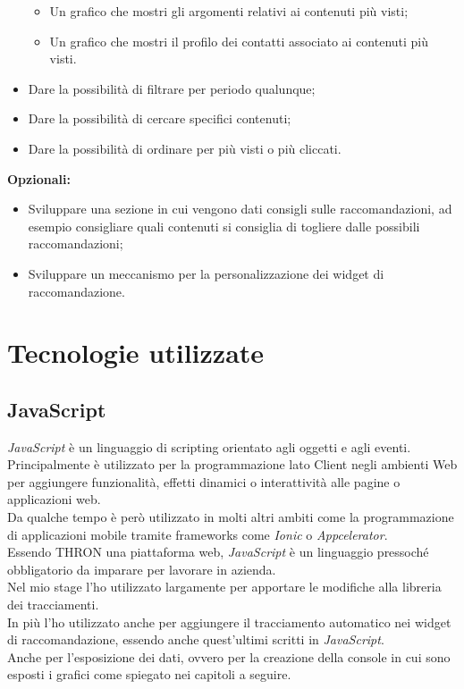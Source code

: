 \documentclass[a4paper, 12pt, twoside, openright]{book}
\begin{document}
\begin{itemize}
\begin{itemize}
		\item Un grafico che mostri gli argomenti relativi ai contenuti più visti;
		\item Un grafico che mostri il profilo dei contatti associato ai contenuti più visti.
		
	\end{itemize}

	\item Dare la possibilità di filtrare per periodo qualunque;
	\item Dare la possibilità di cercare specifici contenuti;
	\item Dare la possibilità di ordinare per più visti o più cliccati.
\end{itemize}
\textbf{Opzionali:}
\begin{itemize}
	\item Sviluppare una sezione in cui vengono dati consigli sulle raccomandazioni, ad esempio consigliare quali contenuti si consiglia di togliere dalle possibili raccomandazioni;
	\item Sviluppare un meccanismo per la personalizzazione dei widget di raccomandazione.
\end{itemize}

\newpage{}
\section{Tecnologie utilizzate}

\subsection{JavaScript}
\textit{JavaScript} è un linguaggio di scripting orientato agli oggetti e agli eventi. Principalmente è utilizzato per la programmazione lato Client negli ambienti Web per aggiungere funzionalità, effetti dinamici o interattività alle pagine o applicazioni web.\\
Da qualche tempo è però utilizzato in molti altri ambiti come la programmazione di applicazioni mobile tramite frameworks come \textit{Ionic} o \textit{Appcelerator}.\\

Essendo THRON una piattaforma web, \textit{JavaScript} è un linguaggio pressoché obbligatorio da imparare per lavorare in azienda.\\
Nel mio stage l'ho utilizzato largamente per apportare le modifiche alla libreria dei tracciamenti.\\ 
In più l'ho utilizzato anche per aggiungere il tracciamento automatico nei widget di raccomandazione, essendo anche quest'ultimi scritti in \textit{JavaScript}.\\
Anche per l'esposizione dei dati, ovvero per la creazione della console in cui sono esposti i grafici come spiegato nei capitoli a seguire.\\ \\
\end{document}
